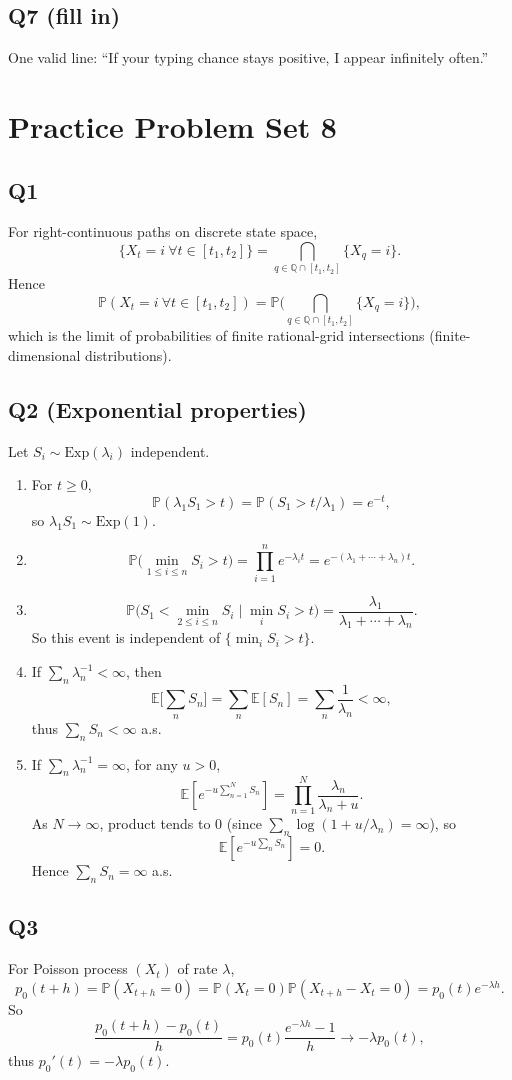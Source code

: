 \documentclass[11pt]{article}
\newcommand{\PP}{\mathbb{P}}
\newcommand{\EE}{\mathbb{E}}
\newcommand{\1}{\mathbf{1}}
\begin{document}
\subsection*{Q7 (fill in)}
One valid line: ``If your typing chance stays positive, I appear infinitely often.''

\section{Practice Problem Set 8}

\subsection*{Q1}
For right-continuous paths on discrete state space,
\[
\{X_t=i\ \forall t\in[t_1,t_2]\}=\bigcap_{q\in\mathbb Q\cap[t_1,t_2]}\{X_q=i\}.
\]
Hence
\[
\PP(X_t=i\ \forall t\in[t_1,t_2])
=\PP\Big(\bigcap_{q\in\mathbb Q\cap[t_1,t_2]}\{X_q=i\}\Big),
\]
which is the limit of probabilities of finite rational-grid intersections (finite-dimensional distributions).

\subsection*{Q2 (Exponential properties)}
Let $S_i\sim\mathrm{Exp}(\lambda_i)$ independent.
\begin{enumerate}[label=(\alph*)]
\item For $t\ge0$,
\[
\PP(\lambda_1S_1>t)=\PP(S_1>t/\lambda_1)=e^{-t},
\]
so $\lambda_1S_1\sim\mathrm{Exp}(1)$.
\item
\[
\PP\Big(\min_{1\le i\le n}S_i>t\Big)=\prod_{i=1}^n e^{-\lambda_it}=e^{-(\lambda_1+\cdots+\lambda_n)t}.
\]
\item
\[
\PP\Big(S_1<\min_{2\le i\le n}S_i\mid\min_i S_i>t\Big)=\frac{\lambda_1}{\lambda_1+\cdots+\lambda_n}.
\]
So this event is independent of $\{\min_iS_i>t\}$.
\item If $\sum_n\lambda_n^{-1}<\infty$, then
\[
\EE\Big[\sum_n S_n\Big]=\sum_n\EE[S_n]=\sum_n\frac1{\lambda_n}<\infty,
\]
thus $\sum_n S_n<\infty$ a.s.
\item If $\sum_n\lambda_n^{-1}=\infty$, for any $u>0$,
\[
\EE\left[e^{-u\sum_{n=1}^N S_n}\right]=\prod_{n=1}^N\frac{\lambda_n}{\lambda_n+u}.
\]
As $N\to\infty$, product tends to $0$ (since $\sum_n\log(1+u/\lambda_n)=\infty$), so
\[
\EE\left[e^{-u\sum_n S_n}\right]=0.
\]
Hence $\sum_nS_n=\infty$ a.s.
\end{enumerate}

\subsection*{Q3}
For Poisson process $(X_t)$ of rate $\lambda$,
\[
p_0(t+h)=\PP(X_{t+h}=0)=\PP(X_t=0)\PP(X_{t+h}-X_t=0)=p_0(t)e^{-\lambda h}.
\]
So
\[
\frac{p_0(t+h)-p_0(t)}{h}=p_0(t)\frac{e^{-\lambda h}-1}{h}\to-\lambda p_0(t),
\]
thus $p_0'(t)=-\lambda p_0(t)$.
\end{document}
